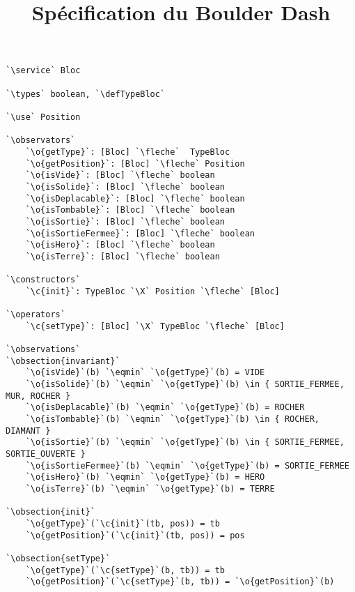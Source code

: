 \documentclass{article}
\title{Spécification du Boulder Dash}
\author{}
\date{}
\newcommand{\fleche}{$\rightarrow{}$}
\newcommand{\X}{$\times{}$}
\newcommand{\eqmin}{$\overset{min}{=}$}
\newcommand{\specsec}[1]{\normalfont{\large{\textbf{#1:}}}}
\newcommand{\service}{\specsec {Service}}
\newcommand{\types}{\specsec {Types}}
\newcommand{\use}{\specsec {Use}}
\newcommand{\observators}{\specsec {Observators}}
\newcommand{\constructors}{\specsec {Constructors}}
\newcommand{\operators}{\specsec {Operators}}
\newcommand{\observations}{\specsec {Observations}}
\newcommand{\obsection}[1]{\textbf{[#1]}}
\newcommand{\TypeBloc}{TypeBloc}
\newcommand{\defTypeBloc}{\mbox{enum \TypeBloc}~\{~VIDE, TERRE, MUR, HERO, SORTIE\_FERMEE, SORTIE\_OUVERTE, ROCHER, DIAMANT~\}}
\renewcommand{\o}[1]{\textcolor{blue}{#1}}
\renewcommand{\c}[1]{\textcolor{red}{#1}}
\begin{document}
\begin{lstlisting}[caption=Bloc]
`\service` Bloc

`\types` boolean, `\defTypeBloc`

`\use` Position

`\observators`
	`\o{getType}`: [Bloc] `\fleche`  TypeBloc
	`\o{getPosition}`: [Bloc] `\fleche` Position
	`\o{isVide}`: [Bloc] `\fleche` boolean
	`\o{isSolide}`: [Bloc] `\fleche` boolean
	`\o{isDeplacable}`: [Bloc] `\fleche` boolean
	`\o{isTombable}`: [Bloc] `\fleche` boolean
	`\o{isSortie}`: [Bloc] `\fleche` boolean
	`\o{isSortieFermee}`: [Bloc] `\fleche` boolean
	`\o{isHero}`: [Bloc] `\fleche` boolean
	`\o{isTerre}`: [Bloc] `\fleche` boolean

`\constructors`
	`\c{init}`: TypeBloc `\X` Position `\fleche` [Bloc]

`\operators`
	`\c{setType}`: [Bloc] `\X` TypeBloc `\fleche` [Bloc]

`\observations`
`\obsection{invariant}`
	`\o{isVide}`(b) `\eqmin` `\o{getType}`(b) = VIDE
	`\o{isSolide}`(b) `\eqmin` `\o{getType}`(b) \in { SORTIE_FERMEE, MUR, ROCHER }
	`\o{isDeplacable}`(b) `\eqmin` `\o{getType}`(b) = ROCHER
	`\o{isTombable}`(b) `\eqmin` `\o{getType}`(b) \in { ROCHER, DIAMANT }
	`\o{isSortie}`(b) `\eqmin` `\o{getType}`(b) \in { SORTIE_FERMEE, SORTIE_OUVERTE }
	`\o{isSortieFermee}`(b) `\eqmin` `\o{getType}`(b) = SORTIE_FERMEE
	`\o{isHero}`(b) `\eqmin` `\o{getType}`(b) = HERO
	`\o{isTerre}`(b) `\eqmin` `\o{getType}`(b) = TERRE

`\obsection{init}`
	`\o{getType}`(`\c{init}`(tb, pos)) = tb
	`\o{getPosition}`(`\c{init}`(tb, pos)) = pos

`\obsection{setType}`
	`\o{getType}`(`\c{setType}`(b, tb)) = tb
	`\o{getPosition}`(`\c{setType}`(b, tb)) = `\o{getPosition}`(b)
\end{lstlisting}

\clearpage{}
\end{document}
